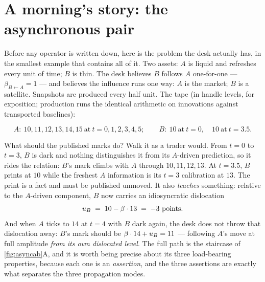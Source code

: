 \documentclass[11pt]{article}
\begin{document}
\section{A morning's story: the asynchronous pair}
\label{sec:story}

Before any operator is written down, here is the problem the desk actually
has, in the smallest example that contains all of it.  Two assets: $A$ is
liquid and refreshes every unit of time; $B$ is thin.  The desk believes
$B$ follows $A$ one-for-one --- $\beta_{B\leftarrow A}=1$ --- and believes
the influence runs one way: $A$ is the market; $B$ is a satellite.
Snapshots are produced every half unit.  The tape (in handle levels, for
exposition; production runs the identical arithmetic on innovations against
transported baselines):

\[
A:\ 10,11,12,13,14,15\ \text{at}\ t=0,1,2,3,4,5;\qquad
B:\ 10\ \text{at}\ t=0,\quad 10\ \text{at}\ t=3.5 .
\]

What should the published marks do?  Walk it as a trader would.  From
$t=0$ to $t=3$, $B$ is dark and nothing distinguishes it from its
$A$-driven prediction, so it rides the relation: $B$'s mark climbs with $A$
through $10,11,12,13$.  At $t=3.5$, $B$ prints at $10$ while the freshest
$A$ information is its $t=3$ calibration at $13$.  The print is a fact and
must be published unmoved.  It also \emph{teaches} something: relative to
the $A$-driven component, $B$ now carries an idiosyncratic dislocation
\[
u_B \;=\; 10-\beta\cdot 13 \;=\; \gtpabresidual\ \text{points}.
\]
And when $A$ ticks to $14$ at $t=4$ with $B$ dark again, the desk does not
throw that dislocation away: $B$'s mark should be
$\beta\cdot14+u_B=11$ --- following $A$'s move at full amplitude
\emph{from its own dislocated level}.  The full path is the staircase of
\cref{fig:asyncab}A, and it is worth being precise about its three
load-bearing properties, because each one is an \emph{assertion}, and the
three assertions are exactly what separates the three propagation modes.
\end{document}
